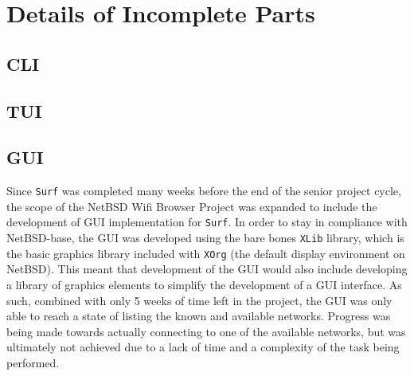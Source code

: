 \documentclass[11pt]{article}
\begin{document}
\section*{Details of Incomplete Parts}
\subsection*{CLI}

\subsection*{TUI}

\subsection*{GUI}
Since \texttt{Surf} was completed many weeks before the end of the senior project cycle,
the scope of the NetBSD Wifi Browser Project was expanded to include the development of 
GUI implementation for \texttt{Surf}.
In order to stay in compliance with NetBSD-base, the GUI was developed using the bare bones
\texttt{XLib} library, which is the basic graphics library included with \texttt{XOrg} 
(the default display environment on NetBSD).
This meant that development of the GUI would also include developing a library of graphics
elements to simplify the development of a GUI interface.
As such, combined with only 5 weeks of time left in the project, the GUI was only able
to reach a state of listing the known and available networks.
Progress was being made towards actually connecting to one of the available networks,
but was ultimately not achieved due to a lack of time and a complexity of the task
being performed.
\end{document}
